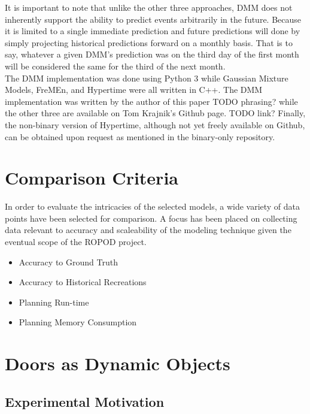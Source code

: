   It is important to note that unlike the other three approaches, DMM does
  not inherently support the ability to predict events arbitrarily in the future.
  Because it is limited to a single immediate prediction and future predictions
  will done by simply projecting historical predictions forward on a monthly basis.
  That is to say, whatever a given DMM's prediction was on the third day of the first month
  will be considered the same for the third of the next month. \\

  The DMM implementation was done using Python 3 while Gaussian Mixture
  Models, FreMEn, and Hypertime were all written in C++. The DMM implementation
  was written by the author of this paper TODO phrasing? while the other three
  are available on Tom Krajnik's Github page. TODO link? Finally, the non-binary
  version of Hypertime, although not yet freely available on Github, can
  be obtained upon request as mentioned in the binary-only repository.




  \section{ Comparison Criteria }
  In order to evaluate the intricacies of the selected models, a wide variety
  of data points have been selected for comparison. A focus has been placed on
  collecting data relevant to accuracy and scaleability of the modeling
  technique given the eventual scope of the ROPOD project.

  \begin{itemize}

    \item Accuracy to Ground Truth

    \item Accuracy to Historical Recreations

    \item Planning Run-time

    \item Planning Memory Consumption

  \end{itemize}

  \section{ Doors as Dynamic Objects }

  \subsection{ Experimental Motivation }

